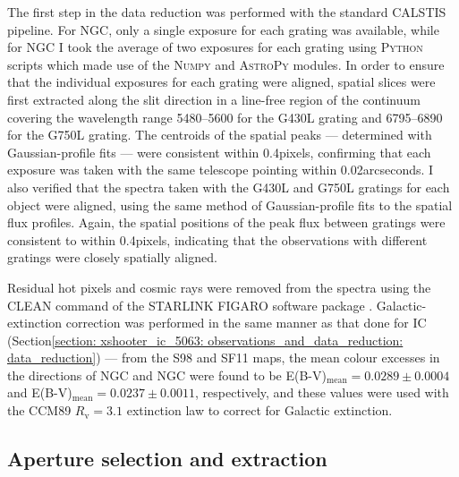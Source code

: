 The first step in the data reduction was performed with the standard \mbox{\textsc{CALSTIS}} pipeline. For NGC, only a single exposure for each grating was available, while for NGC I took the average of two exposures for each grating using \textsc{Python} scripts which made use of the \textsc{Numpy} \citep{Harris2020} and \mbox{\textsc{AstroPy}} \citep{AstropyCollaboration2013, AstropyCollaboration2018} modules. In order to ensure that the individual exposures for each grating were aligned, spatial slices were first extracted along the slit direction in a line-free region of the continuum covering the wavelength range 5480--5600\;{\AA} for the G430L grating and 6795--6890\;{\AA} for the G750L grating. The centroids of the spatial peaks --- determined with Gaussian-profile fits --- were consistent within 0.4\;pixels, confirming that each exposure was taken with the same telescope pointing within 0.02\;arcseconds. I also verified that the spectra taken with the G430L and G750L gratings for each object were aligned, using the same method of Gaussian-profile fits to the spatial flux profiles. Again, the spatial positions of the peak flux between gratings were consistent to within 0.4\;pixels, indicating that the observations with different gratings were closely spatially aligned.

Residual hot pixels and cosmic rays were removed from the spectra using the \textsc{CLEAN} command of the \textsc{STARLINK FIGARO} software package \citep{Currie2014}. Galactic-extinction correction was performed in the same manner as that done for IC (Section\;\ref{section: xshooter_ic_5063: observations_and_data_reduction: data_reduction}) --- from the S98 and SF11 maps, the mean colour excesses in the directions of NGC and NGC were found to be \mbox{E(B-V)$_\mathrm{mean}=0.0289\pm0.0004$} and \mbox{E(B-V)$_\mathrm{mean}=0.0237\pm0.0011$}, respectively, and these values were used with the CCM89 $R_\mathrm{v}=3.1$ extinction law to correct for Galactic extinction.

\subsection{Aperture selection and extraction}
\label{section: stis_seyferts: apertures}

